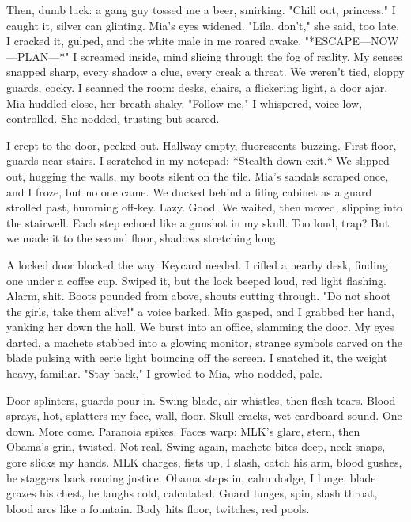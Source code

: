 \documentclass{article}
\begin{document}
Then, dumb luck: a gang guy tossed me a beer, smirking. "Chill out, princess." I caught it, silver can glinting. Mia's eyes widened. "Lila, don't," she said, too late. I cracked it, gulped, and the white male in me roared awake. "*ESCAPE—NOW—PLAN—*" I screamed inside, mind slicing through the fog of reality. My senses snapped sharp, every shadow a clue, every creak a threat. We weren't tied, sloppy guards, cocky. I scanned the room: desks, chairs, a flickering light, a door ajar. Mia huddled close, her breath shaky. "Follow me," I whispered, voice low, controlled. She nodded, trusting but scared.

I crept to the door, peeked out. Hallway empty, fluorescents buzzing. First floor, guards near stairs. I scratched in my notepad: *Stealth down exit.* We slipped out, hugging the walls, my boots silent on the tile. Mia's sandals scraped once, and I froze, but no one came. We ducked behind a filing cabinet as a guard strolled past, humming off-key. Lazy. Good. We waited, then moved, slipping into the stairwell. Each step echoed like a gunshot in my skull. Too loud, trap? But we made it to the second floor, shadows stretching long.

A locked door blocked the way. Keycard needed. I rifled a nearby desk, finding one under a coffee cup. Swiped it, but the lock beeped loud, red light flashing. Alarm, shit. Boots pounded from above, shouts cutting through. "Do not shoot the girls, take them alive!" a voice barked. Mia gasped, and I grabbed her hand, yanking her down the hall. We burst into an office, slamming the door. My eyes darted, a machete stabbed into a glowing monitor, strange symbols carved on the blade pulsing with eerie light bouncing off the screen. I snatched it, the weight heavy, familiar. "Stay back," I growled to Mia, who nodded, pale.

Door splinters, guards pour in. Swing blade, air whistles, then flesh tears. Blood sprays, hot, splatters my face, wall, floor. Skull cracks, wet cardboard sound. One down. More come. Paranoia spikes. Faces warp: MLK's glare, stern, then Obama's grin, twisted. Not real. Swing again, machete bites deep, neck snaps, gore slicks my hands. MLK charges, fists up, I slash, catch his arm, blood gushes, he staggers back roaring justice. Obama steps in, calm dodge, I lunge, blade grazes his chest, he laughs cold, calculated. Guard lunges, spin, slash throat, blood arcs like a fountain. Body hits floor, twitches, red pools.
\end{document}
